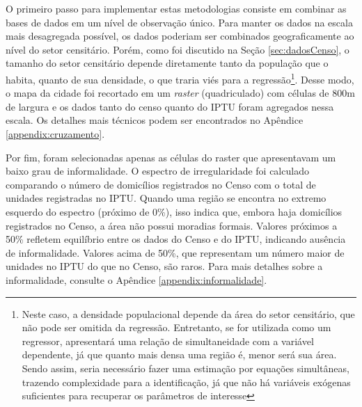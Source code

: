 
O primeiro passo para implementar estas metodologias consiste em combinar as bases de dados em um nível de observação único. Para manter os dados na escala mais desagregada possível, os dados poderiam ser combinados geograficamente ao nível do setor censitário. Porém, como foi discutido na Seção \ref{sec:dadosCenso}, o tamanho do setor censitário depende diretamente tanto da população que o habita, quanto de sua densidade, o que traria viés para a regressão\footnote{Neste caso, a densidade populacional depende da área do setor censitário, que não pode ser omitida da regressão. Entretanto, se for utilizada como um regressor, apresentará uma relação de simultaneidade com a variável dependente, já que quanto mais densa uma região é, menor será sua área. Sendo assim, seria necessário fazer uma estimação por equações simultâneas, trazendo complexidade para a identificação, já que não há variáveis exógenas suficientes para recuperar os parâmetros de interesse}. Desse modo, o mapa da cidade foi recortado em um \textit{raster} (quadriculado) com células de 800m de largura e os dados tanto do censo quanto do IPTU foram agregados nessa escala. Os detalhes mais técnicos podem ser encontrados no Apêndice \ref{appendix:cruzamento}. 

Por fim, foram selecionadas apenas as células do raster que apresentavam um baixo grau de informalidade. O espectro de irregularidade foi calculado comparando o número de domicílios registrados no Censo com o total de unidades registradas no IPTU. Quando uma região se encontra no extremo esquerdo do espectro (próximo de 0\%), isso indica que, embora haja domicílios registrados no Censo, a área não possui moradias formais. Valores próximos a 50\% refletem equilíbrio entre os dados do Censo e do IPTU, indicando ausência de informalidade. Valores acima de 50\%, que representam um número maior de unidades no IPTU do que no Censo, são raros. Para mais detalhes sobre a informalidade, consulte o Apêndice \ref{appendix:informalidade}. 

